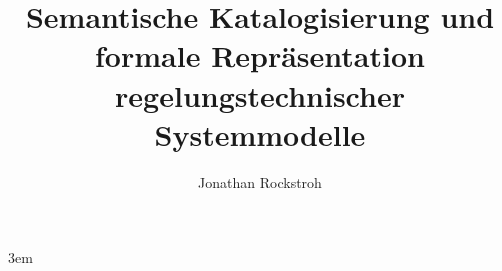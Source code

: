 \documentclass[arbeit=studie, oneside, BCOR=12mm]{ArbeitRST}
\begin{document}
\emergencystretch 3em

\author{Jonathan Rockstroh}



\title{Semantische Katalogisierung und formale Repräsentation regelungstechnischer Systemmodelle}





\pagestyle{plain}


\maketitle





\selbststaendigkeitserklaerung
\end{document}
